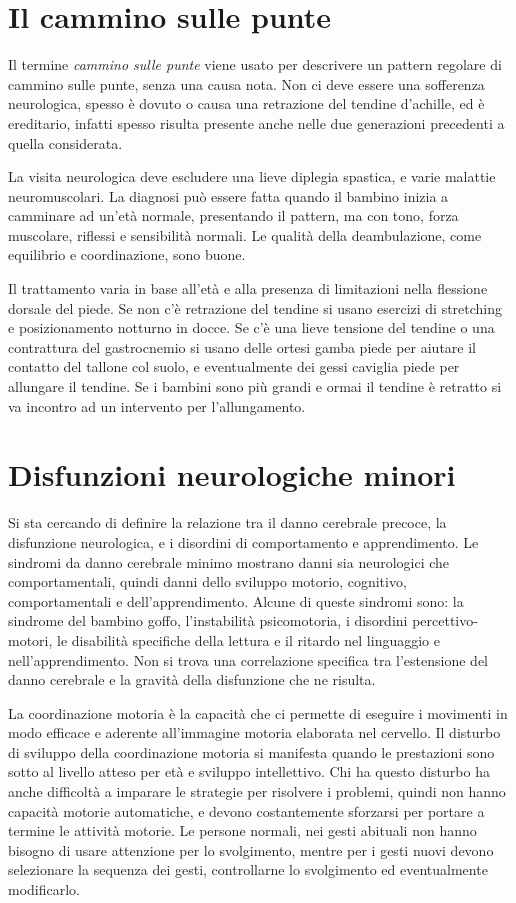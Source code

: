 \chapter{Il cammino sulle punte}
Il termine \textit{cammino sulle punte} viene usato per descrivere un pattern regolare di cammino sulle punte, senza una causa nota.
Non ci deve essere una sofferenza neurologica, spesso è dovuto o causa una retrazione del tendine d'achille, ed è ereditario, infatti
spesso risulta presente anche nelle due generazioni precedenti a quella considerata.

La visita neurologica deve escludere una lieve diplegia spastica, e varie malattie neuromuscolari. La diagnosi può essere fatta quando
il bambino inizia a camminare ad un'età normale, presentando il pattern, ma con tono, forza muscolare, riflessi e sensibilità normali.
Le qualità della deambulazione, come equilibrio e coordinazione, sono buone.

Il trattamento varia in base all'età e alla presenza di limitazioni nella flessione dorsale del piede.
Se non c'è retrazione del tendine si usano esercizi di stretching e posizionamento notturno in docce.
Se c'è una lieve tensione del tendine o una contrattura del gastrocnemio si usano delle ortesi gamba piede per aiutare il contatto del
tallone col suolo, e eventualmente dei gessi caviglia piede per allungare il tendine.
Se i bambini sono più grandi e ormai il tendine è retratto si va incontro ad un intervento per l'allungamento. 

\chapter{Disfunzioni neurologiche minori}
Si sta cercando di definire la relazione tra il danno cerebrale precoce, la disfunzione neurologica, e i disordini di comportamento e
apprendimento.
Le sindromi da danno cerebrale minimo mostrano danni sia neurologici che comportamentali, quindi danni dello sviluppo motorio,
cognitivo, comportamentali e dell'apprendimento. Alcune di queste sindromi sono: la sindrome del bambino goffo, l'instabilità
psicomotoria, i disordini percettivo-motori, le disabilità specifiche della lettura e il ritardo nel linguaggio e nell'apprendimento.
Non si trova una correlazione specifica tra l'estensione del danno cerebrale e la gravità della disfunzione che ne risulta.

La coordinazione motoria è la capacità che ci permette di eseguire i movimenti in modo efficace e aderente all'immagine motoria
elaborata nel cervello.
Il disturbo di sviluppo della coordinazione motoria si manifesta quando le prestazioni sono sotto al livello atteso per età e sviluppo
intellettivo. Chi ha questo disturbo ha anche difficoltà a imparare le strategie per risolvere i problemi, quindi non hanno capacità
motorie automatiche, e devono costantemente sforzarsi per portare a termine le attività motorie.
Le persone normali, nei gesti abituali non hanno bisogno di usare attenzione per lo svolgimento, mentre per i gesti nuovi devono
selezionare la sequenza dei gesti, controllarne lo svolgimento ed eventualmente modificarlo.

